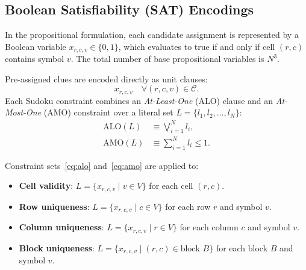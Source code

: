 \documentclass[a4paper,fleqn]{cas-sc}
\begin{document}
\subsection{Boolean Satisfiability (SAT) Encodings}
\label{sec:sat_formulation}
In the propositional formulation, each candidate assignment is represented by a Boolean variable $x_{r, c, v} \in \{0, 1\}$, which evaluates to true if and only if cell $(r, c)$ contains symbol $v$. The total number of base propositional variables is $N^3$.

Pre-assigned clues are encoded directly as unit clauses:
\begin{equation}
    x_{r, c, v} \quad \forall (r, c, v) \in \mathcal{C}.
\end{equation}
Each Sudoku constraint combines an \textit{At-Least-One} (ALO) clause and an \textit{At-Most-One} (AMO) constraint over a literal set $L = \{l_1, l_2, \dots, l_N\}$:
\begin{align}
    \text{ALO}(L) &\equiv \bigvee_{i=1}^N l_i, \label{eq:alo} \\
    \text{AMO}(L) &\equiv \sum_{i=1}^N l_i \le 1. \label{eq:amo}
\end{align}

Constraint sets~\eqref{eq:alo} and~\eqref{eq:amo} are applied to:
\begin{itemize}
    \item \textbf{Cell validity}: $L = \{x_{r, c, v} \mid v \in V\}$ for each cell $(r, c)$.
    \item \textbf{Row uniqueness}: $L = \{x_{r, c, v} \mid c \in V\}$ for each row $r$ and symbol $v$.
    \item \textbf{Column uniqueness}: $L = \{x_{r, c, v} \mid r \in V\}$ for each column $c$ and symbol $v$.
    \item \textbf{Block uniqueness}: $L = \{x_{r, c, v} \mid (r, c) \in \text{block } B\}$ for each block $B$ and symbol $v$.
\end{itemize}
\end{document}
